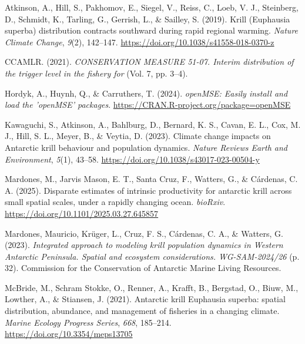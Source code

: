 \documentclass[
]{article}
\newlength{\cslhangindent}
\newlength{\cslentryspacingunit} %
\newenvironment{CSLReferences}[2] %
 {%
  \setlength{\parindent}{0pt}
  \ifodd #1
  \let\oldpar\par
  \def\par{\hangindent=\cslhangindent\oldpar}
  \fi
  \setlength{\parskip}{#2\cslentryspacingunit}
 }%
 {}
\begin{document}
\hypertarget{refs}{}
\begin{CSLReferences}{1}{0}
\leavevmode{}%
Atkinson, A., Hill, S., Pakhomov, E., Siegel, V., Reiss, C., Loeb, V. J., Steinberg, D., Schmidt, K., Tarling, G., Gerrish, L., \& Sailley, S. (2019). {Krill (Euphausia superba) distribution contracts southward during rapid regional warming}. \emph{Nature Climate Change}, \emph{9}(2), 142--147. \url{https://doi.org/10.1038/s41558-018-0370-z}

\leavevmode{}%
CCAMLR. (2021). \emph{{CONSERVATION MEASURE 51-07. Interim distribution of the trigger level in the fishery for}} (Vol. 7, pp. 3--4).

\leavevmode{}%
Hordyk, A., Huynh, Q., \& Carruthers, T. (2024). \emph{openMSE: Easily install and load the 'openMSE' packages}. \url{https://CRAN.R-project.org/package=openMSE}

\leavevmode{}%
Kawaguchi, S., Atkinson, A., Bahlburg, D., Bernard, K. S., Cavan, E. L., Cox, M. J., Hill, S. L., Meyer, B., \& Veytia, D. (2023). {Climate change impacts on Antarctic krill behaviour and population dynamics}. \emph{Nature Reviews Earth and Environment}, \emph{5}(1), 43--58. \url{https://doi.org/10.1038/s43017-023-00504-y}

\leavevmode{}%
Mardones, M., Jarvis Mason, E. T., Santa Cruz, F., Watters, G., \& Cárdenas, C. A. (2025). Disparate estimates of intrinsic productivity for antarctic krill across small spatial scales, under a rapidly changing ocean. \emph{bioRxiv}. \url{https://doi.org/10.1101/2025.03.27.645857}

\leavevmode{}%
Mardones, Mauricio, Krüger, L., Cruz, F. S., Cárdenas, C. A., \& Watters, G. (2023). \emph{{Integrated approach to modeling krill population dynamics in Western Antarctic Peninsula. Spatial and ecosystem considerations. WG-SAM-2024/26}} (p. 32). Commission for the Conservation of Antarctic Marine Living Resources.

\leavevmode{}%
McBride, M., Schram Stokke, O., Renner, A., Krafft, B., Bergstad, O., Biuw, M., Lowther, A., \& Stiansen, J. (2021). {Antarctic krill Euphausia superba: spatial distribution, abundance, and management of fisheries in a changing climate}. \emph{Marine Ecology Progress Series}, \emph{668}, 185--214. \url{https://doi.org/10.3354/meps13705}


\end{CSLReferences}
\end{document}
